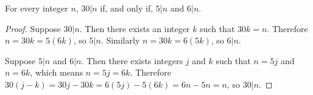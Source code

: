 
\begin{theorem}
  For every integer $n$, $30|n$ if, and only if, $5|n$ and $6|n$.
\end{theorem}

\begin{proof}
  Suppose $30|n$. Then there exists an integer $k$ such that $30k=n$. Therefore
  $n=30k=5(6k)$, so $5|n$. Similarly $n=30k=6(5k)$, so $6|n$.

  Suppose $5|n$ and $6|n$. Then there exists integers $j$ and $k$ such that $n=5j$
  and $n=6k$, which means $n=5j=6k$. Therefore $30(j-k)=30j-30k=6(5j)-5(6k)=6n-5n=n$, so $30|n$.
\end{proof}
